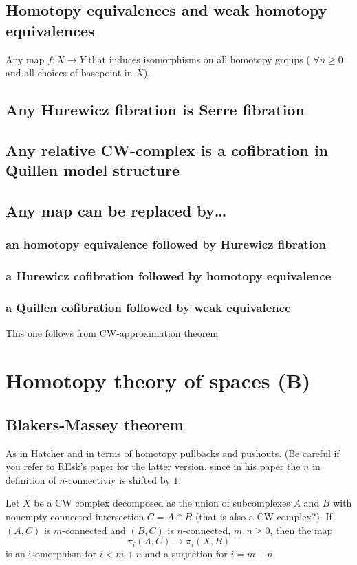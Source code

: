 \subsection{Homotopy equivalences and weak homotopy equivalences}

\begin{defn}
	Any map $f:X\to Y$ that induces isomorphisms on all homotopy groups ( $\forall n\geq 0$ and all choices of basepoint in $X$).
\end{defn}

\subsection{Any Hurewicz fibration is Serre fibration}
\subsection{Any relative CW-complex is a cofibration in Quillen model structure}
\subsection{Any map can be replaced by…} 
\subsubsection{an homotopy equivalence followed by Hurewicz fibration}
\subsubsection{a Hurewicz cofibration followed by homotopy equivalence}
\subsubsection{a Quillen cofibration followed by weak equivalence}
This one follows from CW-approximation theorem

\section{Homotopy theory  of spaces (B)}

\subsection{Blakers-Massey theorem}

As in Hatcher and in terms of homotopy pullbacks and pushouts. (Be careful if you refer to REsk's paper for the latter version, since in his paper the $n$ in definition of $n$-connectiviy is shifted by $1$.
\begin{thm}
	Let $X$ be a CW complex decomposed as the union of subcomplexes $A$ and $B$ with nonempty connected intersection $C=A\cap B$ {\color{magenta}(that is also a CW complex?)}. If $(A,C)$ is $m$-connected and $(B,C)$ is $n$-connected, $m,n\geq 0$, then the map
	\[\pi_{i}(A,C)\to \pi_{i}(X,B)\]
is an isomorphism for $i<m+n$ and a surjection for $i=m+n$.
\end{thm}

